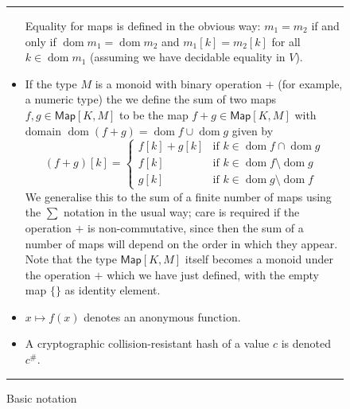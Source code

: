 \documentclass[a4paper]{article}
\newcommand{\s}{\textsf}  %
\theoremstyle{definition}  %
\newcommand\rfskip{7pt}
\newenvironment{ruledfigure}[1]{\begin{figure}[#1]\hrule\vspace{\rfskip}}{\vspace{\rfskip}\hrule\end{figure}}
\newcommand{\false}{\textsf{false}}
\newcommand{\Map}[2]{\ensuremath{\s{Map}[#1,#2]}}
\newcommand{\dom}{\ensuremath{\mathop{\mathrm{dom}}}}
\begin{document}
\begin{ruledfigure}{H}
\begin{itemize}
    Equality for maps is defined in the obvious way: $m_1 = m_2$ if
    and only if $\dom m_1 = \dom m_2$ and $m_1[k] = m_2[k]$ for all
    $k \in \dom m_1$ (assuming we have decidable equality in $V$).

  \item If the type $M$ is a monoid with binary operation $+$ (for
    example, a numeric type) the we define the sum of two maps
    $f, g \in \Map{K}{M}$ to be the map $f+g \in \Map{K}{M}$ with
    domain $\dom (f+g) = \dom f \cup \dom g$ given by
    \[
    (f+g)[k] =
    \left\{ \begin{array}{ll}
        f[k] + g[k] & \mbox{if $k \in \dom f \cap \dom g$}\\
        f[k] & \mbox{if $k \in \dom f \setminus \dom g$}\\
        g[k] & \mbox{if $k \in \dom g \setminus \dom f$}
      \end{array}
      \right.
      \]
      We generalise this to the sum of a finite number of maps using
      the $\sum$ notation in the usual way; care is required if the
      operation $+$ is non-commutative, since then the sum of a number of
      maps will depend on the order in which they appear. Note that
      the type $\Map{K}{M}$ itself becomes a monoid under the
      operation $+$ which we have just defined, with the empty map $\{\}$ as
      identity element.

    \item $x \mapsto f(x)$ denotes an anonymous function.

  \item A cryptographic
    collision-resistant hash of a value $c$ is denoted $c^{\#}$.

\end{itemize}
\caption{Basic notation}
\label{fig:basic-notation}
\end{ruledfigure}

\end{document}
